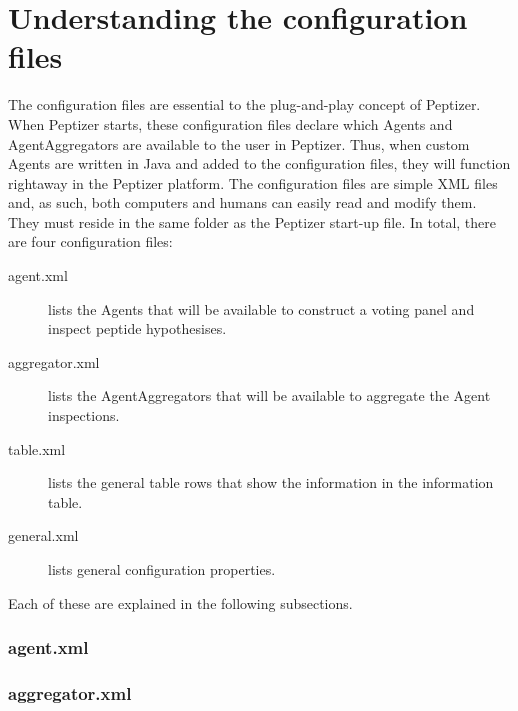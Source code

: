 \section{Understanding the configuration files}
\label{configuration_files}
\npar The configuration files are essential to the plug-and-play concept of Peptizer. When Peptizer starts, these configuration files declare which Agents and AgentAggregators are available to the user in Peptizer. Thus, when custom Agents are written in Java and added to the configuration files, they will function rightaway in the Peptizer platform.
\npar The configuration files are simple XML files and, as such, both computers and humans can easily read and modify them. They must reside in the same folder as the Peptizer start-up file. In total, there are four configuration files:
%
\begin{description}
	\item[agent.xml] lists the Agents that will be available to construct a voting panel and inspect peptide hypothesises.
	\item[aggregator.xml] lists the AgentAggregators that will be available to aggregate the Agent inspections.
	\item[table.xml] lists the general table rows that show the information in the information table.
	\item[general.xml] lists general configuration properties.
\end{description}
%
\npar Each of these are explained in the following subsections. 
\subsubsection{agent.xml}
\subsubsection{aggregator.xml}
